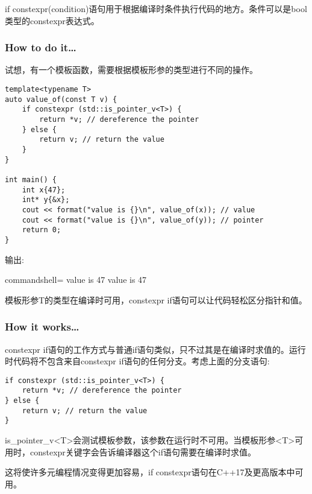 
if constexpr(condition)语句用于根据编译时条件执行代码的地方。条件可以是bool类型的constexpr表达式。

\subsubsection{How to do it…}

试想，有一个模板函数，需要根据模板形参的类型进行不同的操作。

\begin{lstlisting}[style=styleCXX]
template<typename T>
auto value_of(const T v) {
	if constexpr (std::is_pointer_v<T>) {
		return *v; // dereference the pointer
	} else {
		return v; // return the value
	}
}

int main() {
	int x{47};
	int* y{&x};
	cout << format("value is {}\n", value_of(x)); // value
	cout << format("value is {}\n", value_of(y)); // pointer
	return 0;
}
\end{lstlisting}

输出:

\begin{tcblisting}{commandshell={}}
value is 47
value is 47
\end{tcblisting}

模板形参T的类型在编译时可用，constexpr if语句可以让代码轻松区分指针和值。

\subsubsection{How it works…}

constexpr if语句的工作方式与普通if语句类似，只不过其是在编译时求值的。运行时代码将不包含来自constexpr if语句的任何分支。考虑上面的分支语句:

\begin{lstlisting}[style=styleCXX]
if constexpr (std::is_pointer_v<T>) {
	return *v; // dereference the pointer
} else {
	return v; // return the value
}
\end{lstlisting}

is\_pointer\_v<T>会测试模板参数，该参数在运行时不可用。当模板形参<T>可用时，constexpr关键字会告诉编译器这个if语句需要在编译时求值。

这将使许多元编程情况变得更加容易，if constexpr语句在C++17及更高版本中可用。












